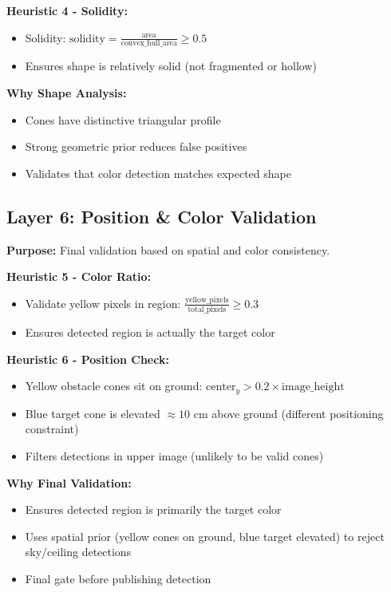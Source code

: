 \documentclass[11pt]{article}
\begin{document}
\textbf{Heuristic 4 - Solidity:}
\begin{itemize}
    \item Solidity: $\text{solidity} = \frac{\text{area}}{\text{convex\_hull\_area}} \geq 0.5$
    \item Ensures shape is relatively solid (not fragmented or hollow)
\end{itemize}

\textbf{Why Shape Analysis:}
\begin{itemize}
    \item Cones have distinctive triangular profile
    \item Strong geometric prior reduces false positives
    \item Validates that color detection matches expected shape
\end{itemize}

\subsection{Layer 6: Position \& Color Validation}

\textbf{Purpose:} Final validation based on spatial and color consistency.

\textbf{Heuristic 5 - Color Ratio:}
\begin{itemize}
    \item Validate yellow pixels in region: $\frac{\text{yellow\_pixels}}{\text{total\_pixels}} \geq 0.3$
    \item Ensures detected region is actually the target color
\end{itemize}

\textbf{Heuristic 6 - Position Check:}
\begin{itemize}
    \item Yellow obstacle cones sit on ground: $\text{center}_y > 0.2 \times \text{image\_height}$
    \item Blue target cone is elevated $\approx 10$ cm above ground (different positioning constraint)
    \item Filters detections in upper image (unlikely to be valid cones)
\end{itemize}

\textbf{Why Final Validation:}
\begin{itemize}
    \item Ensures detected region is primarily the target color
    \item Uses spatial prior (yellow cones on ground, blue target elevated) to reject sky/ceiling detections
    \item Final gate before publishing detection
\end{itemize}
\end{document}
